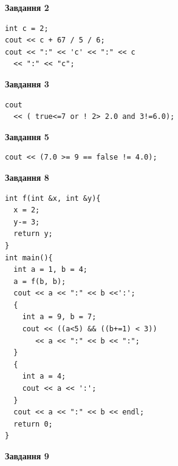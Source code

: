 \documentclass[12pt, ukrainian]{article}
\begin{document}
{\begin {large}
\begin{minipage}[t]{7.0cm}
\end{minipage}
\vline \hspace{1mm}
\begin{minipage}[t]{11.0cm}

\begin{center}
\textbf{Завдання 2}
\end{center}
\vspace{-8mm}

\begin{verbatim}
int c = 2;
cout << c + 67 / 5 / 6;
cout << ":" << 'c' << ":" << c 
  << ":" << "c";
\end{verbatim}



\begin{center}
\textbf{Завдання 3}
\end{center}
\vspace{-8mm}

\begin{verbatim}
cout 
  << ( true<=7 or ! 2> 2.0 and 3!=6.0);
\end{verbatim}



\begin{center}
\textbf{Завдання 5}
\end{center}
\vspace{-8mm}

\begin{verbatim}
cout << (7.0 >= 9 == false != 4.0);
\end{verbatim}



\begin{center}
\textbf{Завдання 8}
\end{center}
\vspace{-8mm}

\begin{verbatim}
int f(int &x, int &y){
  x = 2;
  y-= 3;
  return y;
}
int main(){
  int a = 1, b = 4;
  a = f(b, b);
  cout << a << ":" << b <<':';
  {
    int a = 9, b = 7;
    cout << ((a<5) && ((b+=1) < 3))
       << a << ":" << b << ":";
  }
  {
    int a = 4;
    cout << a << ':';
  }
  cout << a << ":" << b << endl;
  return 0;
}
\end{verbatim}

\end{minipage}


\begin{minipage}[t]{7.0cm}

\begin{center}
\textbf{Завдання 9}
\end{center}
\vspace{-8mm}


\end{minipage}
\end{large}}
\end{document}
